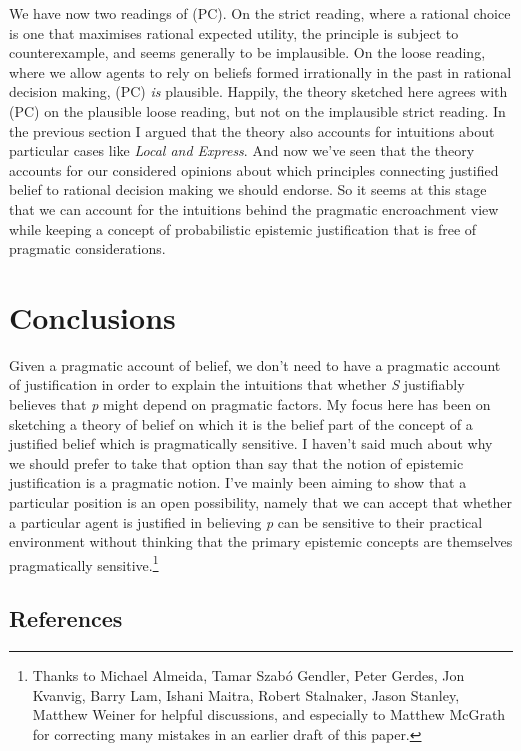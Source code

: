 \documentclass[
  11pt,
  letterpaper,
  DIV=11,
  numbers=noendperiod,
  twoside]{scrartcl}
\begin{document}
We have now two readings of (PC). On the strict reading, where a
rational choice is one that maximises rational expected utility, the
principle is subject to counterexample, and seems generally to be
implausible. On the loose reading, where we allow agents to rely on
beliefs formed irrationally in the past in rational decision making,
(PC) \emph{is} plausible. Happily, the theory sketched here agrees with
(PC) on the plausible loose reading, but not on the implausible strict
reading. In the previous section I argued that the theory also accounts
for intuitions about particular cases like \emph{Local and Express}. And
now we've seen that the theory accounts for our considered opinions
about which principles connecting justified belief to rational decision
making we should endorse. So it seems at this stage that we can account
for the intuitions behind the pragmatic encroachment view while keeping
a concept of probabilistic epistemic justification that is free of
pragmatic considerations.

\section{Conclusions}\label{conclusions}

Given a pragmatic account of belief, we don't need to have a pragmatic
account of justification in order to explain the intuitions that whether
\emph{S} justifiably believes that \emph{p} might depend on pragmatic
factors. My focus here has been on sketching a theory of belief on which
it is the belief part of the concept of a justified belief which is
pragmatically sensitive. I haven't said much about why we should prefer
to take that option than say that the notion of epistemic justification
is a pragmatic notion. I've mainly been aiming to show that a particular
position is an open possibility, namely that we can accept that whether
a particular agent is justified in believing \emph{p} can be sensitive
to their practical environment without thinking that the primary
epistemic concepts are themselves pragmatically sensitive.\footnote{Thanks
  to Michael Almeida, Tamar Szabó Gendler, Peter Gerdes, Jon Kvanvig,
  Barry Lam, Ishani Maitra, Robert Stalnaker, Jason Stanley, Matthew
  Weiner for helpful discussions, and especially to Matthew McGrath for
  correcting many mistakes in an earlier draft of this paper.}

\subsection*{References}\label{references}
\end{document}
